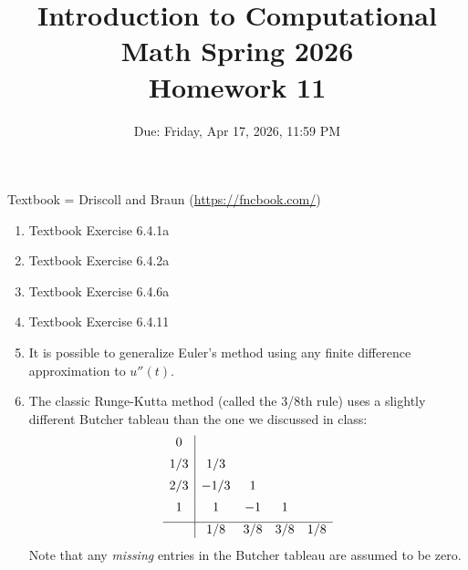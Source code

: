 \documentclass[reqno]{exam}
\title{Introduction to Computational Math Spring 2026 \\ Homework 11}
\date{Due: Friday, Apr 17, 2026, 11:59 PM}
\author{}
\begin{document}
\maketitle
\thispagestyle{empty}

Textbook = Driscoll and Braun (\url{https://fncbook.com/})

\begin{enumerate}

  \item Textbook Exercise 6.4.1a
  \item Textbook Exercise 6.4.2a
  \item Textbook Exercise 6.4.6a
  \item Textbook Exercise 6.4.11


  \item It is possible to generalize Euler's method using any finite difference approximation to $u''(t)$.

  \item The classic Runge-Kutta method (called the 3/8th rule) uses a slightly different Butcher tableau than the one we discussed in class:
        \[
          \begin{array}{c|cccc}
            0   &      &     &           \\[0.5em]
            1/3 & 1/3  &     &           \\[0.5em]
            2/3 & -1/3 & 1   &           \\[0.5em]
            1   & 1  & -1 & 1       \\[0.5em]
            \hline
                & 1/8  & 3/8 & 3/8 & 1/8 \\
          \end{array}
        \]
        Note that any \emph{missing} entries in the Butcher tableau are assumed to be zero.
        \begin{parts}

\end{parts}
\end{enumerate}
\end{document}
